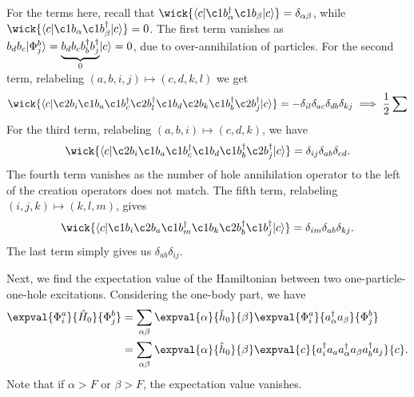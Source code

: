 For the terms here, recall that $\wick{\langle c \vert \c1 b_\alpha^\dagger \c1 b_\beta \vert c \rangle} = \delta_{\alpha \beta}$, while $\wick{\langle c \vert \c1 b_\alpha \c1 b_\beta^\dagger \vert c \rangle} = 0$.
The first term vanishes as $b_d b_c\lvert\Phi_j^{b}\rangle =  \underbrace{b_d b_c b_b^\dagger b_j^\dagger}_{0}\lvert c\rangle= 0$, due to over-annihilation of particles.
For the second term, relabeling $(a, b, i, j) \mapsto (c, d, k, l)$ we get
\begin{equation*}
    \wick{
        \langle
        c \vert
        \c2 b_i
        \c1 b_a
        \c1 b_c^\dagger
        \c2 b_l^\dagger
        \c1 b_d
        \c2 b_k
        \c1 b_b^\dagger
        \c2 b_j^\dagger
        \vert c
        \rangle
    } = -\delta_{il} \delta_{ac} \delta_{db} \delta_{kj} \implies \frac{1}{2} \sum
\end{equation*}
For the third term, relabeling $(a, b, i) \mapsto (c, d, k)$, we have
\begin{equation*}
    \wick{
        \langle
        c \vert
        \c2 b_i
        \c1 b_a
        \c1 b_c^\dagger
        \c1 b_d
        \c1 b_b^\dagger
        \c2 b_j^\dagger
        \vert c
        \rangle
    } = \delta_{ij} \delta_{ab} \delta_{cd}.
\end{equation*}
The fourth term vanishes as the number of hole annihilation operator to the left of the creation operators does not match.
The fifth term, relabeling $(i, j, k) \mapsto (k, l, m)$, gives
\begin{equation*}
    \wick{
        \langle
        c \vert
        \c1 b_i
        \c2 b_a
        \c1 b_m^\dagger
        \c1 b_k
        \c2 b_b^\dagger
        \c1 b_j^\dagger
        \vert c
        \rangle
    } = \delta_{im} \delta_{ab} \delta_{kj}.
\end{equation*}
The last term simply gives us $\delta_{ab} \delta_{ij}$.

\newpage

Next, we find the expectation value of the Hamiltonian between two one-particle-one-hole excitations.
Considering the one-body part, we have
\begin{align*}
    \expval{\Phi_i^a}{\hat{H}_0}{\Phi_j^b} &= \sum_{\alpha\beta} \expval{\alpha}{\hat{h}_0}{\beta} \expval{\Phi_i^a}{a_\alpha^\dagger a_\beta}{\Phi_j^b} \\
    &= \sum_{\alpha\beta} \expval{\alpha}{\hat{h}_0}{\beta} \expval{c}{a_i^\dagger a_a  a_\alpha^\dagger a_\beta a_b^\dagger a_j}{c}.
\end{align*}
Note that if $\alpha > F$ or $\beta > F$, the expectation value vanishes.


